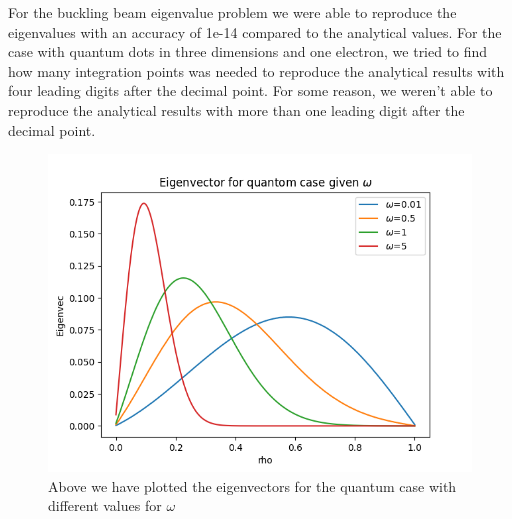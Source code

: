 \documentclass[norsk,a4paper,12pt]{article}
\begin{document}
For the buckling beam eigenvalue problem we were able to reproduce the eigenvalues with an accuracy of 1e-14 compared to the analytical values. For the case with quantum dots in three dimensions and one electron, we tried to find how many integration points was needed to reproduce the analytical results with four leading digits after the decimal point. For some reason, we weren't able to reproduce the analytical results with more than one leading digit after the decimal point. 

\begin{figure}[H]
	\centering
	\includegraphics[width=\linewidth]{Egenvektorer_omega.png}
	\caption{Above we have plotted the eigenvectors for the quantum case with different values for $\omega$}
	\label{fig:omega}
\end{figure}
\end{document}
